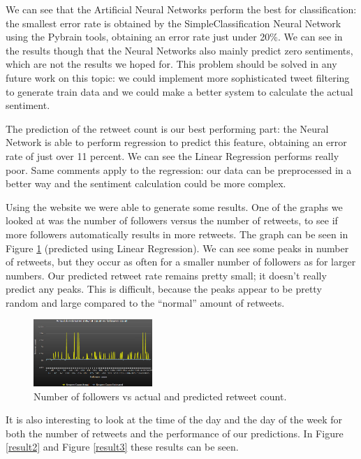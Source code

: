 \documentclass[10pt]{IEEEtran}
\begin{document}
We can see that the Artificial Neural Networks perform the best for classification: the smallest error rate is obtained by the SimpleClassification Neural Network using the Pybrain tools, obtaining an error rate just under 20\%. We can see in the results though that the Neural Networks also mainly predict zero sentiments, which are not the results we hoped for. This problem should be solved in any future work on this topic: we could implement more sophisticated tweet filtering to generate train data and we could make a better system to calculate the actual sentiment. 

The prediction of the retweet count is our best performing part: the Neural Network is able to perform regression to predict this feature, obtaining an error rate of just over 11 percent. We can see the Linear Regression performs really poor. Same comments apply to the regression: our data can be preprocessed in a better way and the sentiment calculation could be more complex. 

Using the website we were able to generate some results. One of the graphs we looked at was the number of followers versus the number of retweets, to see if more followers automatically results in more retweets. The graph can be seen in Figure \ref{result1} (predicted using Linear Regression). We can see some peaks in number of retweets, but they occur as often for a smaller number of followers as for larger numbers. Our predicted retweet rate remains pretty small; it doesn't really predict any peaks. This is difficult, because the peaks appear to be pretty random and large compared to the ``normal'' amount of retweets. 

\begin{figure}[h!]
\begin{center}
\includegraphics[width=0.4\textwidth]{images/giving_tuesday_linear_regression_followers_vs_retweet}
\caption{Number of followers vs actual and predicted retweet count. \label{result1}}
\end{center}
\end{figure}

It is also interesting to look at the time of the day and the day of the week for both the number of retweets and the performance of our predictions. In Figure \ref{result2} and Figure \ref{result3} these results can be seen. 
\end{document}
